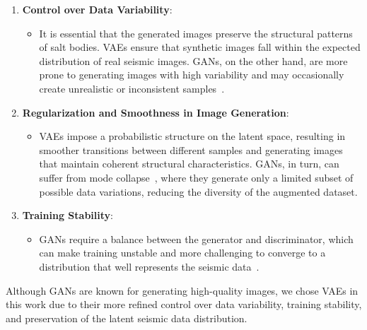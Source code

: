 ﻿\documentclass{ieeeaccess}
\begin{document}
\begin{enumerate}
    \item \textbf{Control over Data Variability}:
    \begin{itemize}
        \item It is essential that the generated images preserve the structural patterns of salt bodies. VAEs ensure that synthetic images fall within the expected distribution of real seismic images. GANs, on the other hand, are more prone to generating images with high variability and may occasionally create unrealistic or inconsistent samples~\cite{Zhou2018}.
    \end{itemize}
    \item \textbf{Regularization and Smoothness in Image Generation}:
    \begin{itemize}
        \item VAEs impose a probabilistic structure on the latent space, resulting in smoother transitions between different samples and generating images that maintain coherent structural characteristics. GANs, in turn, can suffer from mode collapse~\cite{Zhou2018}, where they generate only a limited subset of possible data variations, reducing the diversity of the augmented dataset.
    \end{itemize}
    \item \textbf{Training Stability}:
    \begin{itemize}
        \item GANs require a balance between the generator and discriminator, which can make training unstable and more challenging to converge to a distribution that well represents the seismic data~\cite{Zhou2018}.
    \end{itemize}
\end{enumerate}

Although GANs are known for generating high-quality images, we chose VAEs in this work due to their more refined control over data variability, training stability, and preservation of the latent seismic data distribution.
\end{document}

